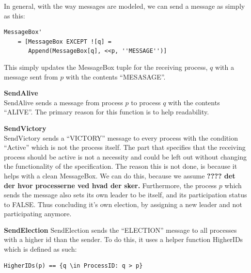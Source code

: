 \documentclass{article}
\begin{document}
\noindent{}

In general, with the way messages are modeled, we can send a message as simply as this:
\begin{lstlisting}
MessageBox'
    = [MessageBox EXCEPT ![q] =
       Append(MessageBox[q], <<p, ''MESSAGE'')]
\end{lstlisting}

This simply updates the MessageBox tuple for the receiving process, $q$ with a message sent from $p$ with the contents ``MESASAGE''.


\textbf{SendAlive}\\
SendAlive sends a message from process $p$ to process $q$ with the contents ``ALIVE''. The primary reason for this function is to help readability.

\textbf{SendVictory}\\
SendVictory sends a ``VICTORY'' message to every process with the condition ``Active'' which is not the process itself. The part that specifies that the receiving process should be active is not a necessity and could be left out without changing the functionality of the specification. The reason this is not done, is because it helps with a clean MessageBox. We can do this, because we assume \textbf{???? det der hvor processerne ved hvad der sker.}
Furthermore, the process $p$ which sends the message also sets its own leader to be itself, and its participation status to FALSE. Thus concluding it's own election, by assigning a new leader and not participating anymore.

\textbf{SendElection}
SendElection sends the ``ELECTION'' message to all processes with a higher id than the sender. To do this, it uses a helper function HigherIDs which is defined as such:
\begin{lstlisting}
HigherIDs(p) == {q \in ProcessID: q > p}
\end{lstlisting}
\end{document}
